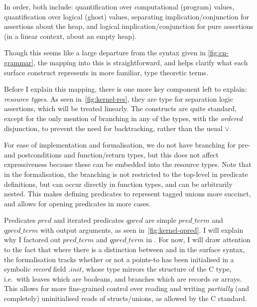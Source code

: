 In order, both include: quantification over computational (program) values,
quantification over logical (ghost) values, separating implication/conjunction
for assertions about the heap, and logical
implication/conjunction for pure assertions (in a linear context, about an
empty heap).

Though this seems like a large departure from the syntax given in
\cref{fig:cn-grammar}, the mapping into this is straightforward, and helps
clarify what each  surface construct represents in more familiar,
type theoretic terms.

Before I explain this mapping, there is one more key component left to explain:
\emph{resource types}. As seen in~\cref{fig:kernel-res}, they are type for
separation logic assertions, which will be treated linearly. The constructs are
quite standard, except for the only mention of branching in any of the types,
with the \emph{ordered} disjunction, to prevent the need for backtracking,
rather than the usual $\vee{}$.

For ease of implementation and formalisation, we do not have branching for pre-
and postconditions and function/return types, but this does not affect
expressiveness because these can be embedded into the resource types. Note that
in the formalisation, the branching is not restricted to the top-level in
predicate definitions, but can occur directly in function types, and can be
arbitrarily nested. This makes defining predicates to represent tagged unions
more succinct, and allows for opening predicates in more cases.

Predicates ${pred}$ and iterated predicates ${qpred}$ are simple ${pred\_term}$
and ${qpred\_term}$ with output arguments, as seen in~\cref{fig:kernel-qpred}.
I will explain why I factored out ${pred\_term}$ and ${qpred\_term}$ in
. For now, I will draw attention to the fact that
where there is a distinction between  and  in
the surface syntax, the formalisation tracks whether or not a points-to has
been initialised in a symbolic \emph{record} field ${.init}$, whose type
mirrors the structure of the C type, i.e.\ with leaves which are booleans, and
branches which are records or arrays. This allows for more fine-grained control
over reading and writing \emph{partially} (and completely) uninitialised reads
of structs/unions,\label{sn:partial-init-read}
as allowed by the C standard.

